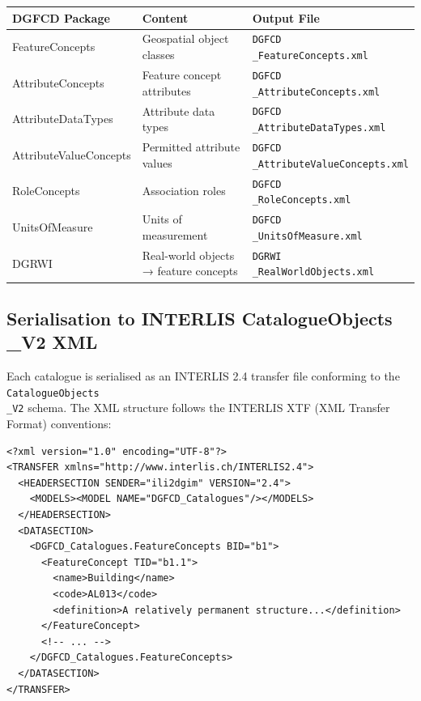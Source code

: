 \documentclass[conference]{IEEEtran}
\begin{document}
\begin{center}
\begin{longtable}{p{}p{}p{}}
DGFCD Package & Content & Output File \\
\midrule
FeatureConcepts & Geospatial object classes & \texttt{DGFCD\\_FeatureConcepts.xml} \\
AttributeConcepts & Feature concept attributes & \texttt{DGFCD\\_AttributeConcepts.xml} \\
AttributeDataTypes & Attribute data types & \texttt{DGFCD\\_AttributeDataTypes.xml} \\
AttributeValueConcepts & Permitted attribute values & \texttt{DGFCD\\_AttributeValueConcepts.xml} \\
RoleConcepts & Association roles & \texttt{DGFCD\\_RoleConcepts.xml} \\
UnitsOfMeasure & Units of measurement & \texttt{DGFCD\\_UnitsOfMeasure.xml} \\
DGRWI & Real-world objects → feature concepts & \texttt{DGRWI\\_RealWorldObjects.xml} \\
\end{longtable}
\end{center}


\subsection{Serialisation to INTERLIS CatalogueObjects\\_V2 XML}

Each catalogue is serialised as an INTERLIS 2.4 transfer file conforming to the \texttt{CatalogueObjects\\_V2} schema. The XML structure follows the INTERLIS XTF (XML Transfer Format) conventions:

\begin{lstlisting}
<?xml version="1.0" encoding="UTF-8"?>
<TRANSFER xmlns="http://www.interlis.ch/INTERLIS2.4">
  <HEADERSECTION SENDER="ili2dgim" VERSION="2.4">
    <MODELS><MODEL NAME="DGFCD_Catalogues"/></MODELS>
  </HEADERSECTION>
  <DATASECTION>
    <DGFCD_Catalogues.FeatureConcepts BID="b1">
      <FeatureConcept TID="b1.1">
        <name>Building</name>
        <code>AL013</code>
        <definition>A relatively permanent structure...</definition>
      </FeatureConcept>
      <!-- ... -->
    </DGFCD_Catalogues.FeatureConcepts>
  </DATASECTION>
</TRANSFER>
\end{lstlisting}
\end{document}
